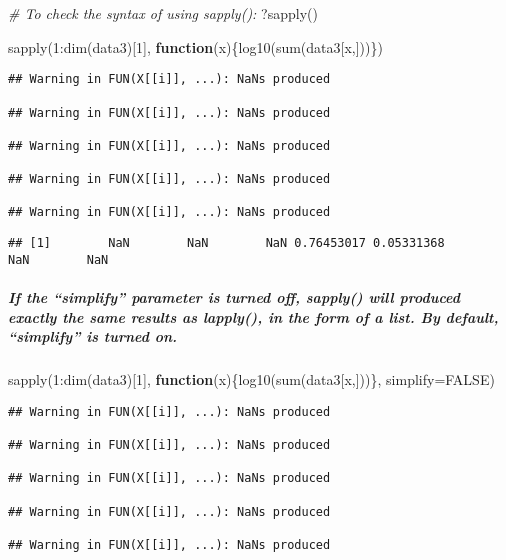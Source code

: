 \documentclass[
]{article}
\newenvironment{Shaded}{\begin{snugshade}}{\end{snugshade}}
\newcommand{\AttributeTok}[1]{\textcolor[rgb]{0.77,0.63,0.00}{#1}}
\newcommand{\CommentTok}[1]{\textcolor[rgb]{0.56,0.35,0.01}{\textit{#1}}}
\newcommand{\ConstantTok}[1]{\textcolor[rgb]{0.00,0.00,0.00}{#1}}
\newcommand{\ControlFlowTok}[1]{\textcolor[rgb]{0.13,0.29,0.53}{\textbf{#1}}}
\newcommand{\DecValTok}[1]{\textcolor[rgb]{0.00,0.00,0.81}{#1}}
\newcommand{\FunctionTok}[1]{\textcolor[rgb]{0.00,0.00,0.00}{#1}}
\newcommand{\NormalTok}[1]{#1}
\newcommand{\SpecialCharTok}[1]{\textcolor[rgb]{0.00,0.00,0.00}{#1}}
\begin{document}
\begin{Shaded}
\begin{Highlighting}[]
\CommentTok{\# To check the syntax of using sapply():}
\NormalTok{?}\FunctionTok{sapply}\NormalTok{()}

\FunctionTok{sapply}\NormalTok{(}\DecValTok{1}\SpecialCharTok{:}\FunctionTok{dim}\NormalTok{(data3)[}\DecValTok{1}\NormalTok{], }\ControlFlowTok{function}\NormalTok{(x)\{}\FunctionTok{log10}\NormalTok{(}\FunctionTok{sum}\NormalTok{(data3[x,]))\})}
\end{Highlighting}
\end{Shaded}

\begin{verbatim}
## Warning in FUN(X[[i]], ...): NaNs produced

## Warning in FUN(X[[i]], ...): NaNs produced

## Warning in FUN(X[[i]], ...): NaNs produced

## Warning in FUN(X[[i]], ...): NaNs produced

## Warning in FUN(X[[i]], ...): NaNs produced
\end{verbatim}

\begin{verbatim}
## [1]        NaN        NaN        NaN 0.76453017 0.05331368        NaN        NaN
\end{verbatim}

\hypertarget{if-the-simplify-parameter-is-turned-off-sapply-will-produced-exactly-the-same-results-as-lapply-in-the-form-of-a-list.-by-default-simplify-is-turned-on.}{%
\subparagraph{If the ``simplify'' parameter is turned off, sapply() will
produced exactly the same results as lapply(), in the form of a list. By
default, ``simplify'' is turned
on.}\label{if-the-simplify-parameter-is-turned-off-sapply-will-produced-exactly-the-same-results-as-lapply-in-the-form-of-a-list.-by-default-simplify-is-turned-on.}}

\begin{Shaded}
\begin{Highlighting}[]
\FunctionTok{sapply}\NormalTok{(}\DecValTok{1}\SpecialCharTok{:}\FunctionTok{dim}\NormalTok{(data3)[}\DecValTok{1}\NormalTok{], }\ControlFlowTok{function}\NormalTok{(x)\{}\FunctionTok{log10}\NormalTok{(}\FunctionTok{sum}\NormalTok{(data3[x,]))\}, }\AttributeTok{simplify=}\ConstantTok{FALSE}\NormalTok{)}
\end{Highlighting}
\end{Shaded}

\begin{verbatim}
## Warning in FUN(X[[i]], ...): NaNs produced

## Warning in FUN(X[[i]], ...): NaNs produced

## Warning in FUN(X[[i]], ...): NaNs produced

## Warning in FUN(X[[i]], ...): NaNs produced

## Warning in FUN(X[[i]], ...): NaNs produced
\end{verbatim}
\end{document}
